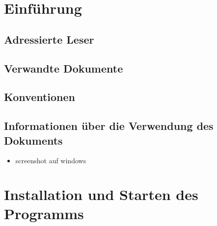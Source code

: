 \documentclass[enabledeprecatedfontcommands,fontsize=11pt,paper=a4,twoside]{scrartcl}
\newcounter{one}
\renewcommand{\headrulewidth}{0pt}
\begin{document}


\newpage

  \thispagestyle{fancy}
  \fancyhead{}
  
  \fancyfoot{}
  \renewcommand{\headrulewidth}{0.4pt}
  \tableofcontents

\newpage



\section{Einführung}
	\subsection{Adressierte Leser}
	\subsection{Verwandte Dokumente}
	\subsection{Konventionen}
	\subsection{Informationen über die Verwendung des Dokuments}

\begin{itemize}
	\item screenshot auf windows	
\end{itemize}


\newpage
\section{Installation und Starten des Programms} \label{sec:installation}
\end{document}
